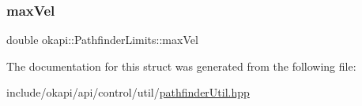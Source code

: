 \mbox{\label{structokapi_1_1PathfinderLimits_a13aebfb7583a59b581e19eb51fa612b1}} 
\subsubsection{\texorpdfstring{maxVel}{maxVel}}
{\footnotesize\ttfamily double okapi\+::\+Pathfinder\+Limits\+::max\+Vel}



The documentation for this struct was generated from the following file\+:\begin{DoxyCompactItemize}
\item 
include/okapi/api/control/util/\mbox{\hyperlink{pathfinderUtil_8hpp}{pathfinder\+Util.\+hpp}}\end{DoxyCompactItemize}
